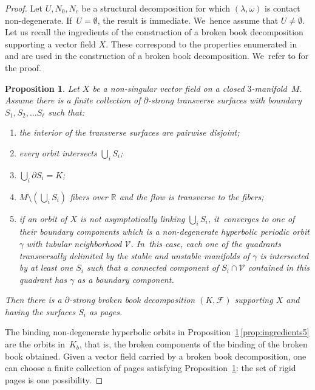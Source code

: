 \documentclass[10pt]{amsart}
\newcommand{\threemanifold}{$3$\nobreakdash-mani\-fold\xspace}
\newtheorem{prop}[theorem]{Proposition}
\theoremstyle{definition}
\begin{document}
\begin{proof}
Let $U, N_0, N_c$ be a structural decomposition for which $(\lambda,\omega)$ is contact non-degenerate. If~$U=\emptyset$, the result is immediate. We~hence assume that $U\neq \emptyset$. Let us recall the ingredients of the construction of a broken book decomposition supporting a vector field $X$. These correspond to the properties enumerated in \cite[Lem.\,3.6]{CDR} and are used in the construction of a broken book decomposition. We~refer to \cite[\S 3]{CDR} for the proof.

\begin{prop}\label{prop:ingredients}
Let $X$ be a non-singular vector field on a closed \threemanifold~$M$. Assume there is a finite collection of $\partial$-strong transverse surfaces with boundary $S_1, S_2, \ldots S_\ell$ such that:
\begin{enumerate}
\item\label{prop:ingredients1} the {interior of the} transverse surfaces {are pairwise disjoint};
\item\label{prop:ingredients2} every orbit intersects $\bigcup_i S_i$;
\item\label{prop:ingredients3} $\bigcup_i\partial S_i= K$;
\item\label{prop:ingredients4} $M\setminus \left(\bigcup_i S_i\right)$ fibers over $\mathbb{R}$ and the flow is transverse to the fibers;
\item\label{prop:ingredients5} if an orbit of $X$ is not asymptotically linking $\bigcup_i S_i$, it~converges to one of their boundary components which is a non-degenerate hyperbolic periodic orbit $\gamma$ with tubular neighborhood $\mathcal{V}$. In~this case, each one of the quadrants transversally delimited by the stable and unstable manifolds of $\gamma$ is intersected by at least one $S_i$ such that a connected component of $S_i\cap \mathcal{V}$ contained in this quadrant has $\gamma$ as a boundary component.
\end{enumerate}
Then there is a $\partial$-strong broken book decomposition $(K,\mathcal{F})$ supporting $X$ and having the surfaces $S_i$ as pages.
\end{prop}

The binding non-degenerate hyperbolic orbits in Proposition~\ref{prop:ingredients}\,\eqref{prop:ingredients5} are the orbits in~$K_b$, that is, the broken components of the binding of the broken book obtained. Given a vector field carried by a broken book decomposition, one can choose a finite collection of pages satisfying Proposition~\ref{prop:ingredients}: the set of rigid pages is one possibility.


\end{proof}
\end{document}
